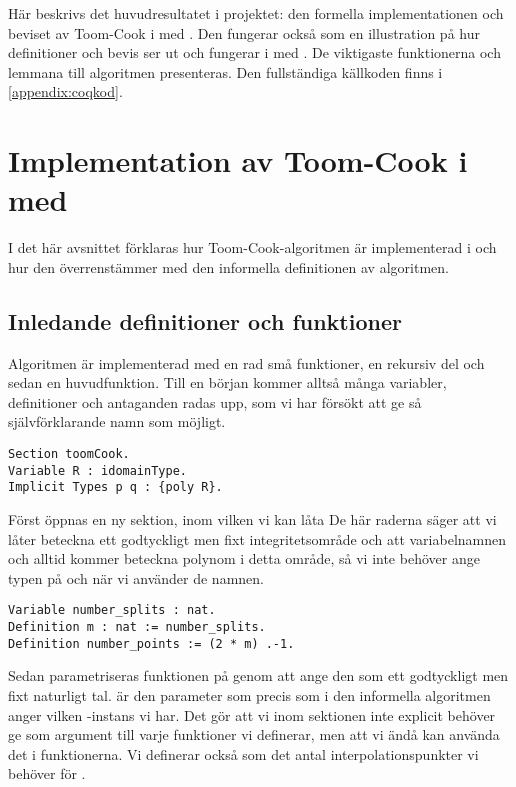 Här beskrivs det huvudresultatet i projektet: den formella implementationen och
beviset av Toom-Cook i \coq{} med \ssr{}. Den fungerar också som en
illustration på hur definitioner och bevis ser ut och fungerar i \coq{} med
\ssr{}. De viktigaste funktionerna och lemmana till algoritmen presenteras. Den
fullständiga källkoden finns i \ref{appendix:coqkod}.

\section{Implementation av Toom-Cook i \coq{} med \ssr{}}
\label{sec:formellimplementation}
I det här avsnittet förklaras hur Toom-Cook-algoritmen är implementerad i
\ssr{} och hur den överrenstämmer med den informella definitionen av
algoritmen.

\subsection{Inledande definitioner och funktioner}
\label{section:forminl}
Algoritmen är implementerad med en rad små funktioner, en rekursiv del och
sedan en huvudfunktion. Till en början kommer alltså många variabler,
definitioner och antaganden radas upp, som vi har försökt att ge så
självförklarande namn som möjligt.

\begin{lstlisting}
Section toomCook.
Variable R : idomainType.
Implicit Types p q : {poly R}.
\end{lstlisting}

Först öppnas en ny sektion, inom vilken vi kan låta De här raderna säger att vi
låter  beteckna ett godtyckligt men fixt integritetsområde och att
variabelnamnen  och  alltid kommer beteckna polynom i detta område,
så vi inte behöver ange typen på  och  när vi använder de namnen.

\begin{lstlisting}
Variable number_splits : nat.
Definition m : nat := number_splits.
Definition number_points := (2 * m) .-1.
\end{lstlisting}

Sedan parametriseras funktionen på  genom att ange den som ett godtyckligt
men fixt naturligt tal.  är den parameter som precis som i den informella
algoritmen anger vilken \toomm{}-instans vi har. Det gör att vi inom sektionen
inte explicit behöver ge  som argument till varje funktioner vi definerar,
men att vi ändå kan använda det i funktionerna. Vi definerar också
 som det antal interpolationspunkter vi behöver för \toomm{}.

